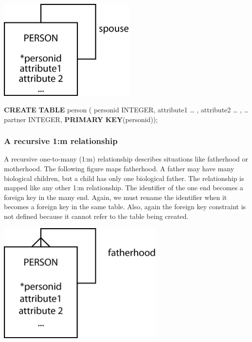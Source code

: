 \documentclass[
]{article}
\newenvironment{Shaded}{\begin{snugshade}}{\end{snugshade}}
\newcommand{\DataTypeTok}[1]{\textcolor[rgb]{0.13,0.29,0.53}{#1}}
\newcommand{\KeywordTok}[1]{\textcolor[rgb]{0.13,0.29,0.53}{\textbf{#1}}}
\newcommand{\NormalTok}[1]{#1}
\begin{document}
\includegraphics[width=2.67708in,height=\textheight]{Figures/Reference 1/r1-person-1-1.png}

\begin{Shaded}
\begin{Highlighting}[]
\KeywordTok{CREATE} \KeywordTok{TABLE}\NormalTok{ person (}
\NormalTok{    personid        }\DataTypeTok{INTEGER}\NormalTok{,}
\NormalTok{    attribute1      … ,}
\NormalTok{    attribute2      … ,}
\NormalTok{    …}
\NormalTok{    partner     }\DataTypeTok{INTEGER}\NormalTok{,}
        \KeywordTok{PRIMARY} \KeywordTok{KEY}\NormalTok{(personid));}
\end{Highlighting}
\end{Shaded}

\hypertarget{a-recursive-1m-relationship}{%
\subsubsection*{A recursive 1:m relationship}\label{a-recursive-1m-relationship}}

A recursive one-to-many (1:m) relationship describes situations like
fatherhood or motherhood. The following figure maps fatherhood. A father
may have many biological children, but a child has only one biological
father. The relationship is mapped like any other 1:m relationship. The
identifier of the one end becomes a foreign key in the many end. Again,
we must rename the identifier when it becomes a foreign key in the same
table. Also, again the foreign key constraint is not defined because it
cannot refer to the table being created.

\includegraphics[width=3.25in,height=\textheight]{Figures/Reference 1/r1-person-1-m.png}
\end{document}
